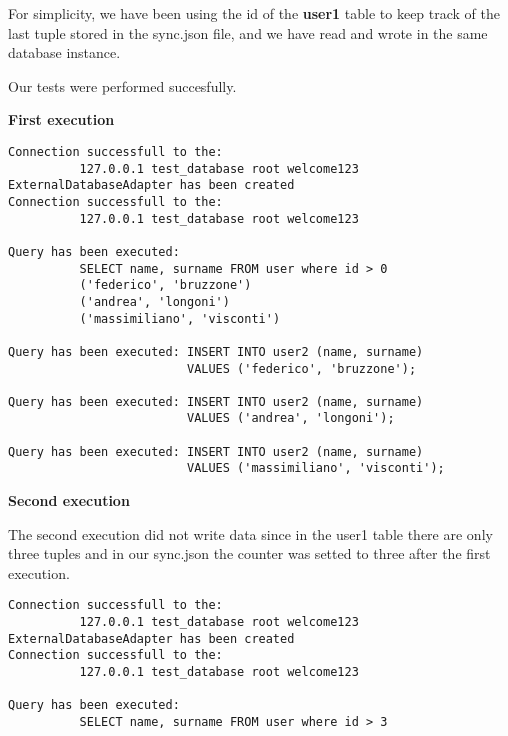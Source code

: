 For simplicity, we have been using the id of the \textbf{user1} table to keep track of the last tuple stored in the sync.json file, and we have read and wrote in the same database instance.

Our tests were performed succesfully.


\textbf{First execution}
\begin{lstlisting}
Connection successfull to the: 
          127.0.0.1 test_database root welcome123 
ExternalDatabaseAdapter has been created
Connection successfull to the: 
          127.0.0.1 test_database root welcome123 

Query has been executed: 
          SELECT name, surname FROM user where id > 0
          ('federico', 'bruzzone')
          ('andrea', 'longoni')
          ('massimiliano', 'visconti')

Query has been executed: INSERT INTO user2 (name, surname) 
                         VALUES ('federico', 'bruzzone');

Query has been executed: INSERT INTO user2 (name, surname) 
                         VALUES ('andrea', 'longoni');

Query has been executed: INSERT INTO user2 (name, surname) 
                         VALUES ('massimiliano', 'visconti');
\end{lstlisting}


\textbf{Second execution}

The second execution did not write data since in the user1 table there are only three tuples and in our sync.json the counter was setted to three after the first execution.

\begin{lstlisting}
Connection successfull to the: 
          127.0.0.1 test_database root welcome123 
ExternalDatabaseAdapter has been created
Connection successfull to the: 
          127.0.0.1 test_database root welcome123 

Query has been executed: 
          SELECT name, surname FROM user where id > 3
\end{lstlisting}
